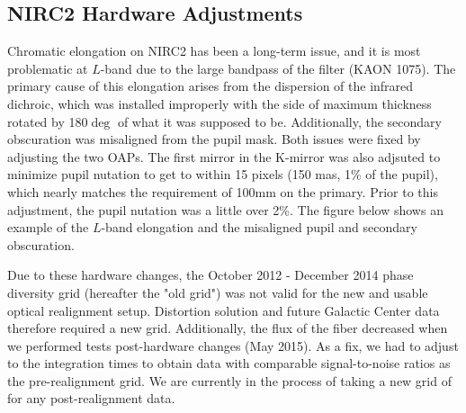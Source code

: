 \subsection{NIRC2 Hardware Adjustments}
\label{sec:instrument_hardware}
Chromatic elongation on NIRC2 has been a long-term issue, and it is most problematic at $L$-band due to the large bandpass of the filter (KAON 1075). The primary cause of this elongation arises from the dispersion of the infrared dichroic, which was installed improperly with the side of maximum thickness rotated by 180$\deg$ of what it was supposed to be. Additionally, the secondary obscuration was misaligned from the pupil mask. Both issues were fixed by adjusting the two OAPs. The first mirror in the K-mirror was also adjsuted to minimize pupil nutation to get to within 15 pixels (150 mas, 1\% of the pupil), which nearly matches the requirement of 100mm on the primary. Prior to this adjustment, the pupil nutation was a little over 2\%. The figure below shows an example of the $L$-band elongation and the misaligned pupil and secondary obscuration.

Due to these hardware changes, the October 2012 - December 2014 phase diversity grid (hereafter the "old grid") was not valid for the new and usable optical realignment setup. Distortion solution and future Galactic Center data therefore required a new grid. Additionally, the flux of the fiber decreased when we performed tests post-hardware changes (May 2015). As a fix, we had to adjust to the integration times to obtain data with comparable signal-to-noise ratios as the pre-realignment grid. We are currently in the process of taking a new grid of for any post-realignment data.

    
    
    
  
  
  
  